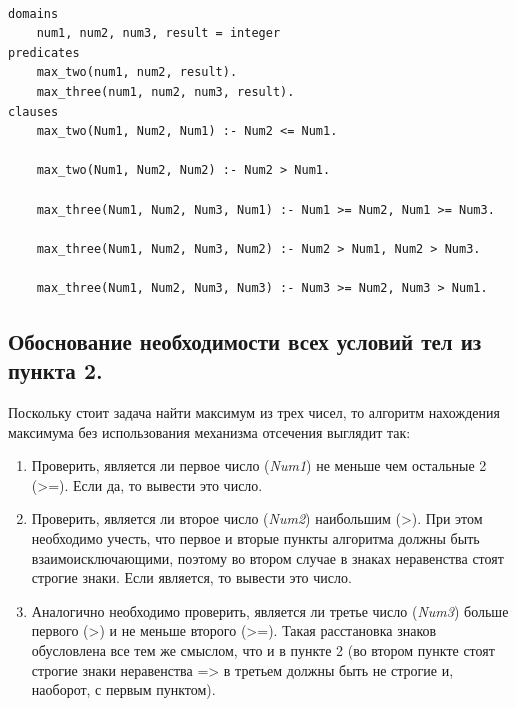 \documentclass[a4paper,12pt]{article}
\begin{document}
	\begin{verbatim}

domains
	num1, num2, num3, result = integer
predicates
	max_two(num1, num2, result).
	max_three(num1, num2, num3, result).
clauses
	max_two(Num1, Num2, Num1) :- Num2 <= Num1.
	
	max_two(Num1, Num2, Num2) :- Num2 > Num1.
	
	max_three(Num1, Num2, Num3, Num1) :- Num1 >= Num2, Num1 >= Num3.
	
	max_three(Num1, Num2, Num3, Num2) :- Num2 > Num1, Num2 > Num3.
	
	max_three(Num1, Num2, Num3, Num3) :- Num3 >= Num2, Num3 > Num1.

	\end{verbatim}

	

	\subsection*{Обоснование необходимости всех условий тел из пункта 2.}

	

	Поскольку стоит задача найти максимум из трех чисел, то алгоритм нахождения максимума без использования механизма отсечения выглядит так:

	

	\begin{enumerate}

		\item Проверить, является ли первое число (\textit{Num1}) не меньше чем остальные 2 (>=). Если да, то вывести это число.

		\item Проверить, является ли второе число (\textit{Num2}) наибольшим (>). При этом необходимо учесть, что первое и вторые пункты алгоритма должны быть взаимоисключающими, поэтому во втором случае в знаках неравенства стоят строгие знаки. Если является, то вывести это число.

		\item Аналогично необходимо проверить, является ли третье число (\textit{Num3}) больше первого (>) и не меньше второго (>=). Такая расстановка знаков обусловлена все тем же смыслом, что и в пункте 2 (во втором пункте стоят строгие знаки неравенства => в третьем должны быть не строгие и, наоборот, с первым пунктом).

	\end{enumerate}

	
\end{document}
